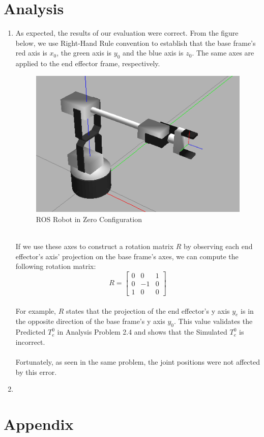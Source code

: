\documentclass[12pt]{article}
\begin{document}
\section{Analysis}
\begin{enumerate}
\item As expected, the results of our evaluation were correct. From the figure below, we use Right-Hand Rule convention to establish that the base frame's red axis is $x_{0}$, the green axis is $y_{0}$ and the blue axis is $z_{0}$. The same axes are applied to the end effector frame, respectively. \\\begin{figure} [h]
	\centering 
	\includegraphics[scale=2]{ImageOfRobotZeroConfig.png}
	\caption{ROS Robot in Zero Configuration}
	\end{figure} \\
If we use these axes to construct a rotation matrix $R$ by observing each end effector's axis' projection on the base frame's axes, we can compute the following rotation matrix:
\\
\begin{equation}
R = \begin{bmatrix}
	0 & 0 & 1 \\
	0 & -1 & 0\\
	1 & 0 & 0
	\end{bmatrix}
\end{equation}
\\
For example, $R$ states that the projection of the end effector's y axis $y_{e}$ is in the opposite direction of the base frame's y axis $y_{0}$. This value validates the Predicted $T^{0}_{e}$ in Analysis Problem 2.4 and shows that the Simulated $T^{0}_{e}$ is incorrect.\\\\Fortunately, as seen in the same problem, the joint positions were not affected by this error.


\item 
\end{enumerate}

\section{Appendix}

	

	

\end{document}

